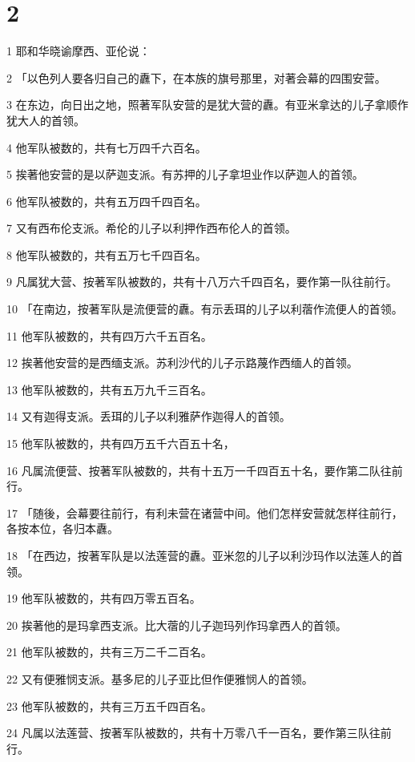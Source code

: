 \chapter{2}

\par 1 耶和华晓谕摩西、亚伦说：
\par 2 「以色列人要各归自己的纛下，在本族的旗号那里，对著会幕的四围安营。
\par 3 在东边，向日出之地，照著军队安营的是犹大营的纛。有亚米拿达的儿子拿顺作犹大人的首领。
\par 4 他军队被数的，共有七万四千六百名。
\par 5 挨著他安营的是以萨迦支派。有苏押的儿子拿坦业作以萨迦人的首领。
\par 6 他军队被数的，共有五万四千四百名。
\par 7 又有西布伦支派。希伦的儿子以利押作西布伦人的首领。
\par 8 他军队被数的，共有五万七千四百名。
\par 9 凡属犹大营、按著军队被数的，共有十八万六千四百名，要作第一队往前行。
\par 10 「在南边，按著军队是流便营的纛。有示丢珥的儿子以利蓿作流便人的首领。
\par 11 他军队被数的，共有四万六千五百名。
\par 12 挨著他安营的是西缅支派。苏利沙代的儿子示路蔑作西缅人的首领。
\par 13 他军队被数的，共有五万九千三百名。
\par 14 又有迦得支派。丢珥的儿子以利雅萨作迦得人的首领。
\par 15 他军队被数的，共有四万五千六百五十名，
\par 16 凡属流便营、按著军队被数的，共有十五万一千四百五十名，要作第二队往前行。
\par 17 「随後，会幕要往前行，有利未营在诸营中间。他们怎样安营就怎样往前行，各按本位，各归本纛。
\par 18 「在西边，按著军队是以法莲营的纛。亚米忽的儿子以利沙玛作以法莲人的首领。
\par 19 他军队被数的，共有四万零五百名。
\par 20 挨著他的是玛拿西支派。比大蓿的儿子迦玛列作玛拿西人的首领。
\par 21 他军队被数的，共有三万二千二百名。
\par 22 又有便雅悯支派。基多尼的儿子亚比但作便雅悯人的首领。
\par 23 他军队被数的，共有三万五千四百名。
\par 24 凡属以法莲营、按著军队被数的，共有十万零八千一百名，要作第三队往前行。
